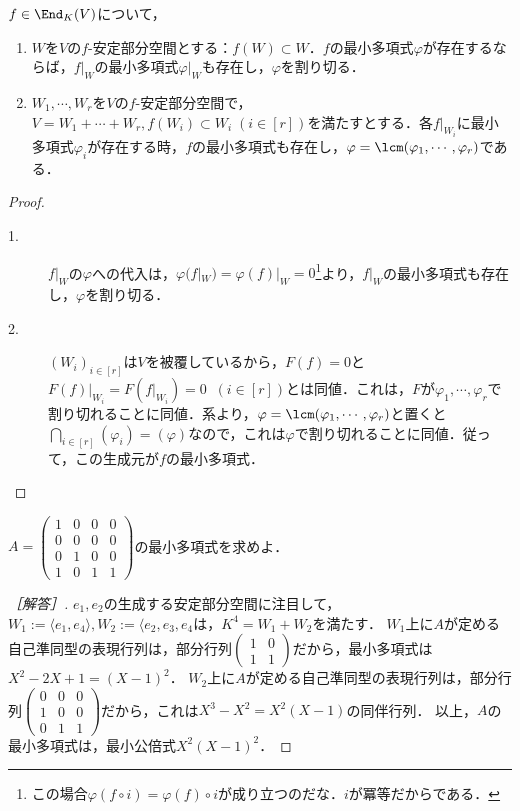 \documentclass[uplatex, dvipdfmx]{jsreport}
\begin{document}
\begin{proposition}[最小公倍式としての最小多項式]\label{prop-algorithm-for-minimal-polynomials-in-the-terms-of-ideal}
    $f\in\End_K(V)$について，
    \begin{enumerate}
        \item $W$を$V$の$f$-安定部分空間とする：$f(W)\subset W$．$f$の最小多項式$\varphi$が存在するならば，$f|_W$の最小多項式$\varphi|_W$も存在し，$\varphi$を割り切る．
        \item $W_1,\cdots,W_r$を$V$の$f$-安定部分空間で，$V=W_1+\cdots+W_r, f(W_i)\subset W_i\;(i\in[r])$を満たすとする．各$f|_{W_i}$に最小多項式$\varphi_i$が存在する時，$f$の最小多項式も存在し，$\varphi=\lcm(\varphi_1,\cdots,\varphi_r)$である．
    \end{enumerate}
\end{proposition}
\begin{proof}\mbox{}
    \begin{description}
        \item[1.] $f|_W$の$\varphi$への代入は，$\varphi(f|_W)=\varphi(f)|_W=0$\footnote{この場合$\varphi(f\circ i)=\varphi(f)\circ i$が成り立つのだな．$i$が冪等だからである．}より，$f|_W$の最小多項式も存在し，$\varphi$を割り切る．
        \item[2.] $(W_i)_{i\in[r]}$は$V$を被覆しているから，$F(f)=0$と$F(f)|_{W_i}=F(f|_{W_i})=0\;\;(i\in[r])$とは同値．これは，$F$が$\varphi_1,\cdots,\varphi_r$で割り切れることに同値．系より，$\varphi=\lcm(\varphi_1,\cdots,\varphi_r)$と置くと$\bigcap_{i\in[r]}(\varphi_i)=(\varphi)$なので，これは$\varphi$で割り切れることに同値．従って，この生成元が$f$の最小多項式．
    \end{description}
\end{proof}

\begin{problem}
    $A=\begin{pmatrix}1&0&0&0\\0&0&0&0\\0&1&0&0\\1&0&1&1\end{pmatrix}$の最小多項式を求めよ．
\end{problem}
\begin{proof}[［解答］]
    $e_1,e_2$の生成する安定部分空間に注目して，
    $W_1:=\langle e_1,e_4\rangle,W_2:=\langle e_2,e_3,e_4$は，$K^4=W_1+W_2$を満たす．
    $W_1$上に$A$が定める自己準同型の表現行列は，部分行列$\begin{pmatrix}1&0\\1&1\end{pmatrix}$だから，最小多項式は$X^2-2X+1=(X-1)^2$．
    $W_2$上に$A$が定める自己準同型の表現行列は，部分行列$\begin{pmatrix}0&0&0\\1&0&0\\0&1&1\end{pmatrix}$だから，これは$X^3-X^2=X^2(X-1)$の同伴行列．
    以上，$A$の最小多項式は，最小公倍式$X^2(X-1)^2$．
\end{proof}
\end{document}
